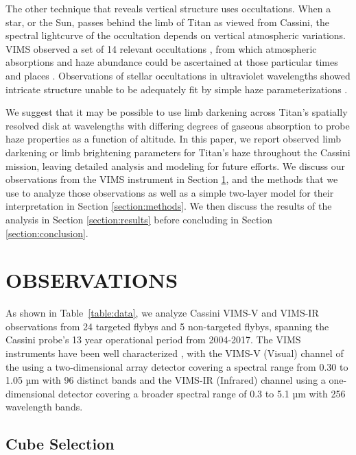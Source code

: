 \documentclass[tighten,linenumbers,twocolumn]{aastex631}
\begin{document}
The other technique that reveals vertical structure uses occultations.  When a star, or the Sun, passes behind the limb of Titan as viewed from Cassini, the spectral lightcurve of the occultation depends on vertical atmospheric variations.  VIMS observed a set of 14 relevant occultations \citep{sotin2016characteristics, robinson2014titan}, from which atmospheric absorptions \citep{bellucci2009titan} and haze abundance could be ascertained at those particular times and places \citep{kim2013spectral, maltagliati2015titan, rannnou2022analysis}.  Observations of stellar occultations in ultraviolet wavelengths \citep{koskinen2011mesosphere} showed intricate structure unable to be adequately fit by simple haze parameterizations \citep{tribbett2021titan}.

We suggest that it may be possible to use limb darkening across Titan's spatially resolved disk at wavelengths with differing degrees of gaseous absorption to probe haze properties as a function of altitude.  In this paper, we report observed limb darkening or limb brightening parameters for Titan's haze throughout the Cassini mission, leaving detailed analysis and modeling for future efforts.  We discuss our observations from the VIMS instrument in Section \ref{section:observations}, and the methods that we use to analyze those observations as well as a simple two-layer model for their interpretation in Section \ref{section:methods}.  We then discuss the results of the analysis in Section \ref{section:results} before concluding in Section \ref{section:conclusion}.


\section{OBSERVATIONS}\label{section:observations}
As shown in Table~\ref{table:data}, we analyze Cassini VIMS-V and VIMS-IR observations from 24 
targeted flybys and 5 non-targeted flybys, spanning the Cassini probe's 13 year operational period from 2004-2017. 
The VIMS instruments have been well characterized \cite{brown2004cassini}, with the VIMS-V (Visual) channel of the using a two-dimensional array detector covering a spectral range from 0.30 to 1.05 µm with 96 distinct bands and the VIMS-IR (Infrared) channel using a one-dimensional detector covering a broader spectral range of 0.3 to 5.1 µm with 256 wavelength bands.
\subsection{Cube Selection}
\end{document}
